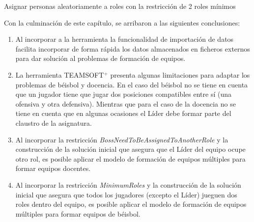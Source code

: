 Asignar personas aleatoriamente a roles con la restricción de 2 roles mínimos


Con la culminación de este capítulo, se arribaron a las siguientes conclusiones:
\begin{enumerate}
	\item Al incorporar a la herramienta la funcionalidad de importación de datos facilita incorporar de forma rápida los datos almacenados en ficheros externos para dar solución al problemas de formación de equipos.
	\item La herramienta TEAMSOFT$^+$ presenta algunas limitaciones para adaptar los problemas de béisbol y docencia. En el caso del béisbol no se tiene en cuenta que un jugador tiene que jugar dos posiciones compatibles entre sí (una ofensiva y otra defensiva). Mientras que para el caso de la docencia no se tiene en cuenta que en algunas ocasiones el Líder debe formar parte del claustro de la asignatura.
	\item Al incorporar la restricción \textit{BossNeedToBeAssignedToAnotherRole} y la construcción de la solución inicial que asegura que el Líder del equipo ocupe otro rol, es posible aplicar el modelo de formación de  equipos múltiples para formar equipos docentes.
	\item Al incorporar la restricción \textit{MinimumRoles} y la construcción de la solución inicial que asegura que todos los jugadores (excepto el Líder) jueguen dos roles dentro del equipo, es posible aplicar el modelo de formación de  equipos múltiples para formar equipos de béisbol.
\end{enumerate}
